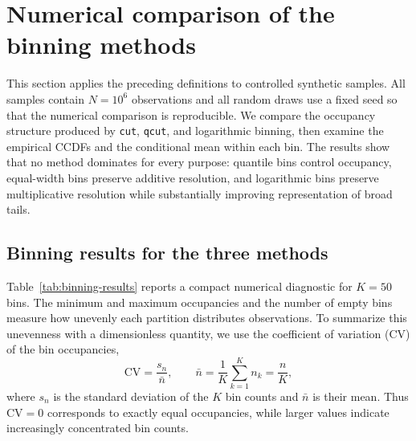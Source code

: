 \section{Numerical comparison of the binning methods}

This section applies the preceding definitions to controlled synthetic samples. All samples contain $N=10^6$ observations and all random draws use a fixed seed so that the numerical comparison is reproducible. We compare the occupancy structure produced by \texttt{cut}, \texttt{qcut}, and logarithmic binning, then examine the empirical CCDFs and the conditional mean within each bin. The results show that no method dominates for every purpose: quantile bins control occupancy, equal-width bins preserve additive resolution, and logarithmic bins preserve multiplicative resolution while substantially improving representation of broad tails.

\subsection{Binning results for the three methods}

Table~\ref{tab:binning-results} reports a compact numerical diagnostic for $K=50$ bins. The minimum and maximum occupancies and the number of empty bins measure how unevenly each partition distributes observations. To summarize this unevenness with a dimensionless quantity, we use the coefficient of variation (CV) of the bin occupancies,
\begin{equation}
 \mathrm{CV}=\frac{s_n}{\bar n},
 \qquad
 \bar n=\frac{1}{K}\sum_{k=1}^{K}n_k=\frac{n}{K},
\end{equation}
where $s_n$ is the standard deviation of the $K$ bin counts and $\bar n$ is their mean. Thus $\mathrm{CV}=0$ corresponds to exactly equal occupancies, while larger values indicate increasingly concentrated bin counts.

